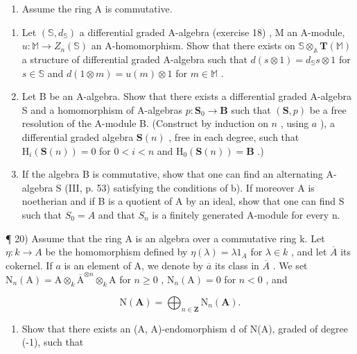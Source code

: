 \begin{enumerate}
\def\labelenumi{\arabic{enumi})}
\setcounter{enumi}{18}
\tightlist
\item
  Assume the ring A is commutative.
\end{enumerate}

\begin{enumerate}
\def\labelenumi{\alph{enumi})}
\item
  Let \((\mathbb{S}, d_{\mathbb{S}})\) a differential graded A-algebra (exercise 18) , M an A-module, \(u: \mathbb{M} \to Z_{n}(\mathbb{S})\) an A-homomorphism. Show that there exists on \(\mathbb{S} \otimes_{\mathbb{A}} \mathbf{T}(\mathbb{M})\) a structure of differential graded A-algebra such that \(d(s \otimes 1) = d_{\mathbb{S}} s \otimes 1\) for \(s \in \mathbb{S}\) and \(d(1 \otimes m) = u(m) \otimes 1\) for \(m \in \mathbb{M}\) .
\item
  Let B be an A-algebra. Show that there exists a differential graded A-algebra S and a homomorphism of A-algebras \(p: \mathbf{S}_{0} \to \mathbf{B}\) such that \((\mathbf{S}, p)\) be a free resolution of the A-module B. (Construct by induction on \(n\) , using \(a\) ), a differential graded algebra \(\mathbf{S}(n)\) , free in each degree, such that \(\mathrm{H}_{i}(\mathbf{S}(n)) = 0\) for \(0 < i < n\) and \(\mathrm{H}_{0}(\mathbf{S}(n)) = \mathbf{B}\) .)
\item
  If the algebra B is commutative, show that one can find an alternating A-algebra S (III, p. 53) satisfying the conditions of b). If moreover A is noetherian and if B is a quotient of A by an ideal, show that one can find S such that \(S_{0} = A\) and that \(S_{n}\) is a finitely generated A-module for every n.
\end{enumerate}

¶ 20) Assume that the ring A is an algebra over a commutative ring k. Let \(\eta: k \to A\) be the homomorphism defined by \(\eta(\lambda) = \lambda 1_{A}\) for \(\lambda \in k\) , and let \(\overline{A}\) its cokernel. If \(a\) is an element of A, we denote by \(\overline{a}\) its class in \(\overline{A}\) . We set \(\mathrm{N}_{n}(\mathrm{A}) = \mathrm{A} \otimes_{k} \overline{\mathrm{A}}^{\otimes n} \otimes_{k} \mathrm{A}\) for \(n \geqslant 0\) , \(\mathrm{N}_{n}(\mathrm{A}) = 0\) for \(n < 0\) , and

\[
\mathrm{N} (\mathbf {A}) = \bigoplus_ {n \in \mathbf {Z}} \mathrm{N} _ {n} (\mathbf {A}).
\]

\begin{enumerate}
\def\labelenumi{\alph{enumi})}
\tightlist
\item
  Show that there exists an (A, A)-endomorphism d of N(A), graded of degree (-1), such that
\end{enumerate}

